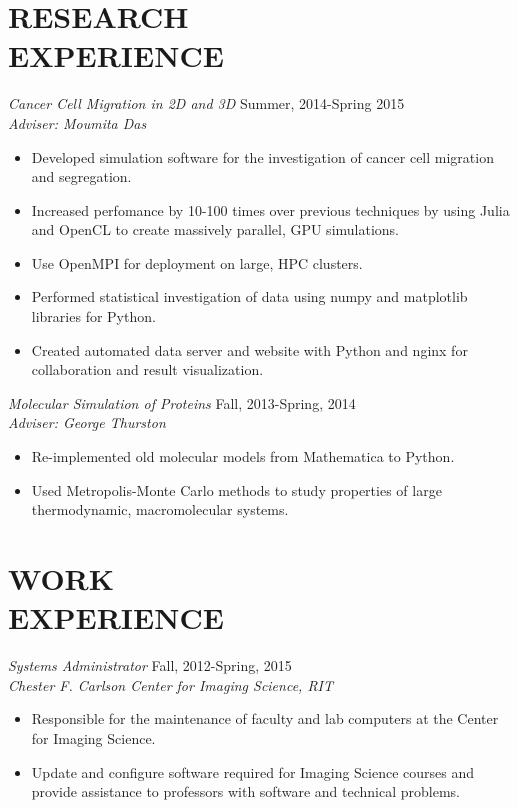 \documentclass[margin]{res}
\begin{document}
\begin{resume}

\section{RESEARCH\\EXPERIENCE}
  {\sl Cancer Cell Migration in 2D and 3D} \hfill  Summer, 2014-Spring 2015\\
  {\sl Adviser: Moumita Das}\\                
  \begin{itemize}
    \item Developed simulation software for the investigation of cancer cell migration
      and segregation.
    \item Increased perfomance by 10-100 times over previous techniques by using
      Julia and OpenCL to create massively parallel, GPU simulations.
    \item Use OpenMPI for deployment on large, HPC clusters.
    \item Performed statistical investigation of data using numpy and matplotlib
      libraries for Python.
    \item  Created automated data server and website with Python and nginx for
      collaboration and result visualization.
  \end{itemize}

  {\sl Molecular Simulation of Proteins} \hfill   Fall, 2013-Spring, 2014 \\
  {\sl Adviser: George Thurston}\\                
  \begin{itemize}
    \item Re-implemented old molecular models from Mathematica to Python.
    \item Used Metropolis-Monte Carlo methods to study 
      properties of large thermodynamic, macromolecular systems.
  \end{itemize}


\section{WORK\\EXPERIENCE}

  {\sl Systems Administrator} \hfill            Fall, 2012-Spring, 2015 \\
  {\sl Chester F. Carlson Center for Imaging Science, RIT}\\
  \begin{itemize}
    \item Responsible for the maintenance of faculty and lab computers
      at the Center for Imaging Science.
    \item Update and configure software required for Imaging Science courses
      and provide assistance to professors with software and technical problems.
  \end{itemize}


\end{resume}
\end{document}
